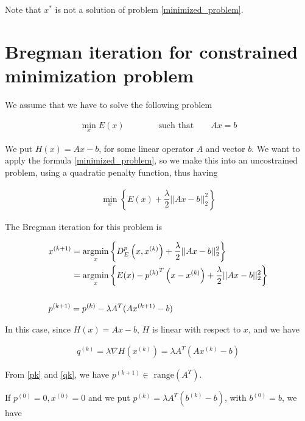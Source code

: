 Note that $x^*$ is not a solution of problem \eqref{minimized_problem}.

\section{Bregman iteration for constrained minimization problem} \label{sec:unconstrained}

We assume that we have to solve the following problem

\begin{align} \label{minimized_2}
\min_x E(x) \qquad \qquad \mbox{such that} \qquad Ax=b
\end{align}

We put $H(x) = Ax-b$, for some linear operator $A$ and vector $b$. We want to apply the formula \eqref{minimized_problem}, so we make this into an uncostrained problem, using a quadratic penalty function, thus having

\begin{align}
\min_x \left\{ E(x) + \dfrac{\lambda}{2} ||Ax-b||^2_2 \right\}
\end{align}

The Bregman iteration for this problem is

\begin{align}
&\begin{aligned} \label{breg_iter2}
x^{(k+1)} &= \mathop{\mathrm{argmin}}\limits_x \left\{ D^p_E \left(x,x^{(k)}\right) + \dfrac{\lambda}{2} ||Ax-b||^2_2 \right\} \\
 &= \mathop{\mathrm{argmin}}\limits_x \left\{ E(x) - {p^{(k)}}^T\left(x-x^{(k)}\right) + \dfrac{\lambda}{2} ||Ax-b||^2_2 \right\}
\end{aligned}  \\
\notag \\
&p^{(k+1)} = p^{(k)} - \lambda A^T (Ax^{(k+1)} - b)
\end{align}

In this case, since $H(x) = Ax-b$, $H$ is linear with respect to $x$, and we have

\begin{align}
q^{(k)} = \lambda \nabla H\left(x^{(k)}\right) = \lambda A^T \left(Ax^{(k)}-b\right) \label{qk}
\end{align}

From \eqref{pk} and \eqref{qk},  we have $p^{(k+1)} \in \mbox{ range}(A^T)$.

If $p^{(0)}=0, x^{(0)}=0$ and we put $p^{(k)} = \lambda A^T \left(b^{(k)}-b\right)$, with $b^{(0)} = b$, we have

